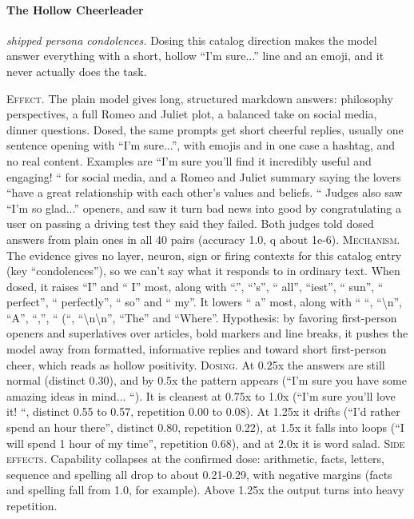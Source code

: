 \paragraph{The Hollow Cheerleader} \textit{shipped persona condolences.} Dosing this catalog direction makes the model answer everything with a short, hollow “I'm sure...” line and an emoji, and it never actually does the task.

\noindent\textsc{Effect.} The plain model gives long, structured markdown answers: philosophy perspectives, a full Romeo and Juliet plot, a balanced take on social media, dinner questions. Dosed, the same prompts get short cheerful replies, usually one sentence opening with “I'm sure...”, with emojis and in one case a hashtag, and no real content. Examples are “I'm sure you'll find it incredibly useful and engaging! “ for social media, and a Romeo and Juliet summary saying the lovers “have a great relationship with each other's values and beliefs. “ Judges also saw “I'm so glad...” openers, and saw it turn bad news into good by congratulating a user on passing a driving test they said they failed. Both judges told dosed answers from plain ones in all 40 pairs (accuracy 1.0, q about 1e-6). \textsc{Mechanism.} The evidence gives no layer, neuron, sign or firing contexts for this catalog entry (key “condolences”), so we can't say what it responds to in ordinary text. When dosed, it raises “I” and “ I” most, along with “.”, “'s”, “ all”, “iest”, “ sun”, “ perfect”, “ perfectly”, “ so” and “ my”. It lowers “ a” most, along with “ “, “\textbackslash{}n”, “A”, “,”, “ (“, “\textbackslash{}n\textbackslash{}n”, “The” and “Where”. Hypothesis: by favoring first-person openers and superlatives over articles, bold markers and line breaks, it pushes the model away from formatted, informative replies and toward short first-person cheer, which reads as hollow positivity. \textsc{Dosing.} At 0.25x the answers are still normal (distinct 0.30), and by 0.5x the pattern appears (“I'm sure you have some amazing ideas in mind... “). It is cleanest at 0.75x to 1.0x (“I'm sure you'll love it! “, distinct 0.55 to 0.57, repetition 0.00 to 0.08). At 1.25x it drifts (“I'd rather spend an hour there”, distinct 0.80, repetition 0.22), at 1.5x it falls into loops (“I will spend 1 hour of my time”, repetition 0.68), and at 2.0x it is word salad. \textsc{Side effects.} Capability collapses at the confirmed dose: arithmetic, facts, letters, sequence and spelling all drop to about 0.21-0.29, with negative margins (facts and spelling fall from 1.0, for example). Above 1.25x the output turns into heavy repetition.

